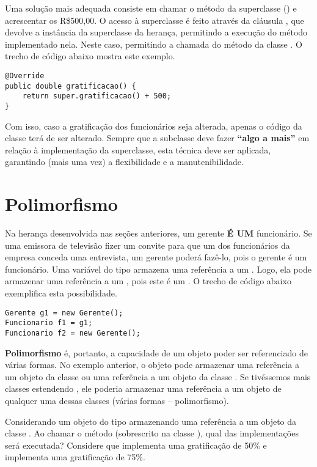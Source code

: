 Uma solução mais adequada consiste em chamar o método  da superclasse () e acrescentar os R\$500,00. O acesso à superclasse é feito através da cláusula , que devolve a instância da superclasse da herança, permitindo a execução do método implementado nela. Neste caso, permitindo a chamada do método  da classe . O trecho de código abaixo mostra este exemplo.

\begin{verbatim}
@Override
public double gratificacao() {
	return super.gratificacao() + 500;
}
\end{verbatim}

Com isso, caso a gratificação dos funcionários seja alterada, apenas o código da classe  terá de ser alterado. Sempre que a subclasse deve fazer \textbf{``algo a mais''} em relação à implementação da superclasse, esta técnica deve ser aplicada, garantindo (mais uma vez) a flexibilidade e a manutenibilidade.


\section{Polimorfismo}
 
Na herança desenvolvida nas seções anteriores, um gerente \textbf{É UM} funcionário. Se uma emissora de televisão fizer um convite para que um dos funcionários da empresa conceda uma entrevista, um gerente poderá fazê-lo, pois o gerente é um funcionário. Uma variável do tipo  armazena uma referência a um . Logo, ela pode armazenar uma referência a um , pois este é um . O trecho de código abaixo exemplifica esta possibilidade.

\begin{verbatim}
Gerente g1 = new Gerente();
Funcionario f1 = g1;
Funcionario f2 = new Gerente();
\end{verbatim}

\textbf{Polimorfismo} é, portanto, a capacidade de um objeto poder ser referenciado de várias formas. No exemplo anterior, o objeto  pode armazenar uma referência a um objeto da classe  ou uma referência a um objeto da classe . Se tivéssemos mais classes estendendo , ele poderia armazenar uma referência a um objeto de qualquer uma dessas classes (várias formas -- polimorfismo).

Considerando um objeto do tipo  armazenando uma referência a um objeto da classe . Ao chamar o método  (sobrescrito na classe ), qual das implementações será executada? Considere que  implementa uma gratificação de 50\% e  implementa uma gratificação de 75\%.

